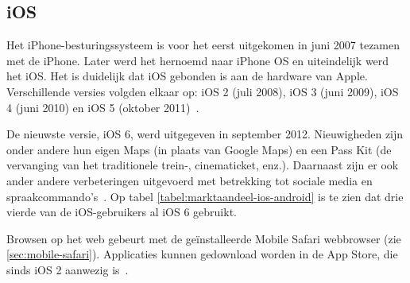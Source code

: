 \begin{table}[t]
\centering
{}
\quad
{}
\caption{Marktaandeel van iOS-versies op 14 februari 2013 en Android-versies op 4 februari 2013 \protect\cite{Sylvain2013,Android2013}.}
\label{tabel:marktaandeel-ios-android}
\end{table}

\subsection{iOS}
Het iPhone-besturingssysteem is voor het eerst uitgekomen in juni 2007 tezamen met de iPhone. 
Later werd het hernoemd naar iPhone OS en uiteindelijk werd het iOS. 
Het is duidelijk dat iOS gebonden is aan de hardware van Apple. 
Verschillende versies volgden elkaar op: iOS 2 (juli 2008), iOS 3 (juni 2009), iOS 4 (juni 2010) en iOS 5 (oktober 2011)~\cite{Deitel2012, PhilDutson2012}. 

De nieuwste versie, iOS 6, werd uitgegeven in september 2012. 
Nieuwigheden zijn onder andere hun eigen Maps (in plaats van Google Maps) en een Pass Kit (de vervanging van het traditionele trein-, cinematicket, enz.). 
Daarnaast zijn er ook ander andere verbeteringen uitgevoerd met betrekking tot sociale media en spraakcommando's~\cite{Deitel2012}. 
Op tabel \ref{tabel:marktaandeel-ios-android} is te zien dat drie vierde van de iOS-gebruikers al iOS 6 gebruikt.

Browsen op het web gebeurt met de geïnstalleerde Mobile Safari webbrowser (zie \ref{sec:mobile-safari}). Applicaties kunnen gedownload worden in de App Store, die sinds iOS 2 aanwezig is~\cite{Deitel2012}. 


